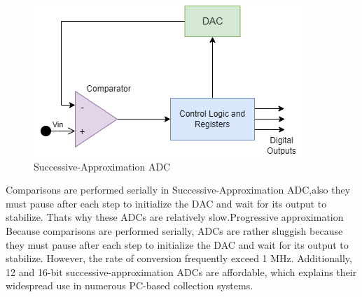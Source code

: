 \begin{figure}[htbp]
\centering
\includegraphics[scale=0.6]{images/SAD.png}
\caption{Successive-Approximation ADC}
\label{fig:x Successive-Approximation ADC}
\end{figure}
Comparisons are performed serially in Successive-Approximation ADC,also they must pause after each step to initialize the DAC and wait for its output to stabilize. Thats why these ADCs are relatively slow.Progressive approximation Because comparisons are performed serially, ADCs are rather sluggish because they must pause after each step to initialize the DAC and wait for its output to stabilize. However, the rate of conversion frequently exceed 1 MHz. Additionally, 12 and 16-bit successive-approximation ADCs are affordable, which explains their widespread use in numerous PC-based collection systems.


